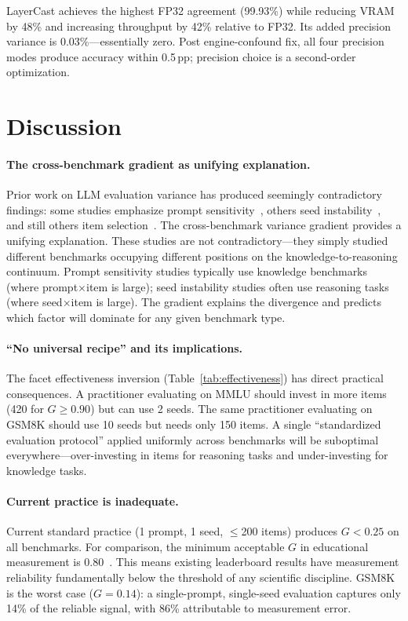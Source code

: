 \documentclass[11pt]{article}
\newcommand{\pp}{\,\text{pp}}
\begin{document}
LayerCast achieves the highest FP32 agreement (99.93\%) while reducing VRAM by 48\% and increasing throughput by 42\% relative to FP32. Its added precision variance is 0.03\%---essentially zero. Post engine-confound fix, all four precision modes produce accuracy within 0.5$\pp$; precision choice is a second-order optimization.


\section{Discussion}

\paragraph{The cross-benchmark gradient as unifying explanation.}
Prior work on LLM evaluation variance has produced seemingly contradictory findings: some studies emphasize prompt sensitivity~\citep{sclar2024quantifying}, others seed instability~\citep{pezeshkpour2024large}, and still others item selection~\citep{polo2024tinybenchmarks}. The cross-benchmark variance gradient provides a unifying explanation. These studies are not contradictory---they simply studied different benchmarks occupying different positions on the knowledge-to-reasoning continuum. Prompt sensitivity studies typically use knowledge benchmarks (where prompt$\times$item is large); seed instability studies often use reasoning tasks (where seed$\times$item is large). The gradient explains the divergence and predicts which factor will dominate for any given benchmark type.

\paragraph{``No universal recipe'' and its implications.}
The facet effectiveness inversion (Table~\ref{tab:effectiveness}) has direct practical consequences. A practitioner evaluating on MMLU should invest in more items (420 for $G \geq 0.90$) but can use 2 seeds. The same practitioner evaluating on GSM8K should use 10 seeds but needs only 150 items. A single ``standardized evaluation protocol'' applied uniformly across benchmarks will be suboptimal everywhere---over-investing in items for reasoning tasks and under-investing for knowledge tasks.

\paragraph{Current practice is inadequate.}
Current standard practice (1 prompt, 1 seed, $\leq$200 items) produces $G < 0.25$ on all benchmarks. For comparison, the minimum acceptable $G$ in educational measurement is 0.80~\citep{brennan2001generalizability}. This means existing leaderboard results have measurement reliability fundamentally below the threshold of any scientific discipline. GSM8K is the worst case ($G = 0.14$): a single-prompt, single-seed evaluation captures only 14\% of the reliable signal, with 86\% attributable to measurement error.
\end{document}

